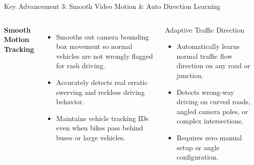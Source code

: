 \documentclass[10pt, compress, aspectratio=169]{beamer}
\begin{document}
\begin{frame}{Key Advancement 3: Smooth Video Motion \& Auto Direction Learning}
    \begin{columns}[c]
        \textbf{\textcolor{BTPPrimary}{Smooth Motion Tracking}}
        \vspace{2mm}
        \begin{itemize}\small
            \item Smooths out camera bounding box movement so normal vehicles are not wrongly flagged for rash driving.
            \item Accurately detects real erratic swerving and reckless driving behavior.
            \item Maintains vehicle tracking IDs even when bikes pass behind buses or large vehicles.
        \end{itemize}

        \begin{block}{Adaptive Traffic Direction}
            \begin{itemize}\small
                \item Automatically learns normal traffic flow direction on any road or junction.
                \item Detects wrong-way driving on curved roads, angled camera poles, or complex intersections.
                \item Requires zero manual setup or angle configuration.
            \end{itemize}
        \end{block}
    \end{columns}
\end{frame}
\end{document}
